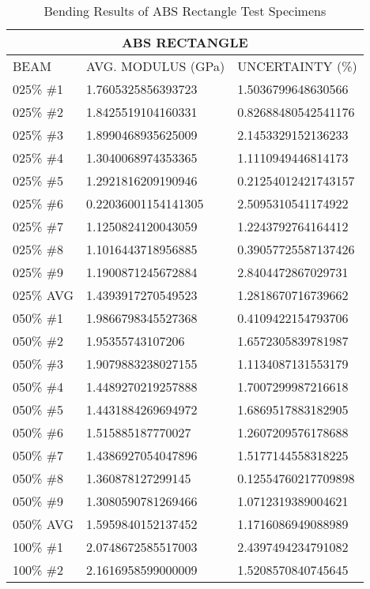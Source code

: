 \begin{longtable}{ | X | X | X | }
	\caption{Bending Results of ABS Rectangle Test Specimens}
	\label{tab:abs_rectangle_data}
	\endhead
	\hline
	\multicolumn{3}{|c|}{ABS RECTANGLE} \\ \hline
	BEAM & AVG. MODULUS (GPa) & UNCERTAINTY (\%) \\ \hline
	025\% \#1 & 1.7605325856393723 & 1.5036799648630566 \\ \hline
	025\% \#2 & 1.8425519104160331 & 0.82688480542541176 \\ \hline
	025\% \#3 & 1.8990468935625009 & 2.1453329152136233 \\ \hline
	025\% \#4 & 1.3040068974353365 & 1.1110949446814173 \\ \hline
	025\% \#5 & 1.2921816209190946 & 0.21254012421743157 \\ \hline
	025\% \#6 & 0.22036001154141305 & 2.5095310541174922 \\ \hline
	025\% \#7 & 1.1250824120043059 & 1.2243792764164412 \\ \hline
	025\% \#8 & 1.1016443718956885 & 0.39057725587137426 \\ \hline
	025\% \#9 & 1.1900871245672884 & 2.8404472867029731 \\ \hline
	025\% AVG & 1.4393917270549523 & 1.2818670716739662 \\ \hline
	050\% \#1 & 1.9866798345527368 & 0.4109422154793706 \\ \hline
	050\% \#2 & 1.95355743107206 & 1.6572305839781987 \\ \hline
	050\% \#3 & 1.9079883238027155 & 1.1134087131553179 \\ \hline
	050\% \#4 & 1.4489270219257888 & 1.7007299987216618 \\ \hline
	050\% \#5 & 1.4431884269694972 & 1.6869517883182905 \\ \hline
	050\% \#6 & 1.515885187770027 & 1.2607209576178688 \\ \hline
	050\% \#7 & 1.4386927054047896 & 1.5177144558318225 \\ \hline
	050\% \#8 & 1.360878127299145 & 0.12554760217709898 \\ \hline
	050\% \#9 & 1.3080590781269466 & 1.0712319389004621 \\ \hline
	050\% AVG & 1.5959840152137452 & 1.1716086949088989 \\ \hline
	100\% \#1 & 2.0748672585517003 & 2.4397494234791082 \\ \hline
	100\% \#2 & 2.1616958599000009 & 1.5208570840745645 \\ \hline

\end{longtable}
